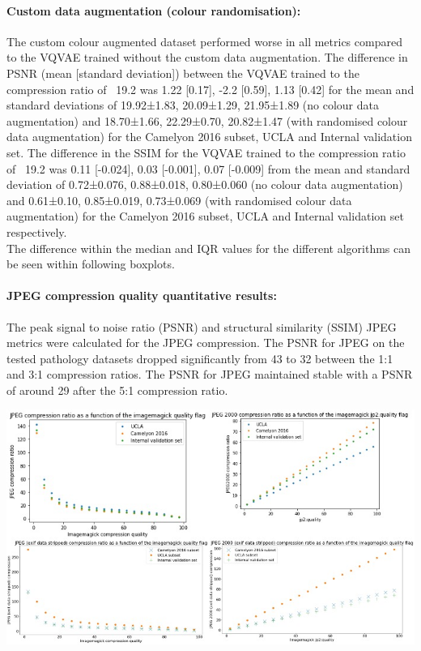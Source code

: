 \documentclass[review]{elsarticle}
\begin{document}
\paragraph{Custom data augmentation (colour randomisation):} The custom colour augmented dataset performed worse in all metrics compared to the VQVAE trained without the custom data augmentation. The difference in PSNR (mean [standard deviation]) between the VQVAE trained to the compression ratio of ~19.2 was 1.22 [0.17], -2.2 [0.59], 1.13 [0.42] for the mean and standard deviations of 19.92±1.83, 20.09±1.29, 21.95±1.89 (no colour data augmentation) and 18.70±1.66, 22.29±0.70, 20.82±1.47 (with randomised colour data augmentation) for the Camelyon 2016 subset, UCLA and Internal validation set. The difference in the SSIM for the VQVAE trained to the compression ratio of ~19.2 was 0.11 [-0.024], 0.03 [-0.001], 0.07 [-0.009] from the mean and standard deviation of 0.72±0.076, 0.88±0.018, 0.80±0.060 (no colour data augmentation) and 0.61±0.10, 0.85±0.019, 0.73±0.069 (with randomised colour data augmentation) for the Camelyon 2016 subset, UCLA and Internal validation set respectively. \\
The difference within the median and IQR values for the different algorithms can be seen within following boxplots.

\paragraph{JPEG compression quality quantitative results:} The peak signal to noise ratio (PSNR) and structural similarity (SSIM) JPEG metrics were calculated for the JPEG compression. The PSNR for JPEG on the tested pathology datasets dropped significantly from 43 to 32 between the 1:1 and 3:1 compression ratios. The PSNR for JPEG maintained stable with a PSNR of around 29 after the 5:1 compression ratio.

\begin{center}
\includegraphics[width=1\linewidth]{Figures/JPEG ImageMagick compression quality to compression ratio with and without metadata.jpeg}
\end{center}
\end{document}
